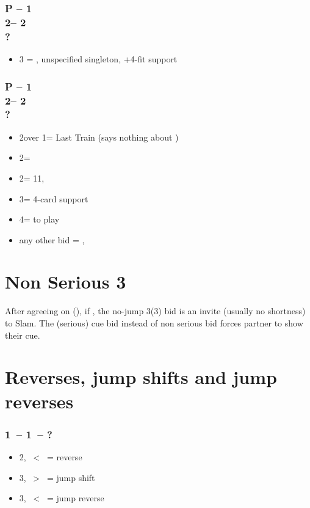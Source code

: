 \subsubsection*{P -- 1\major \\ 2\clubs -- 2\major \\ ?}
\begin{itemize}
    \item 3 = \nat, unspecified singleton, +4-fit \major support
\end{itemize}

\subsubsection*{P -- 1\major \\ 2\clubs -- 2\diams \\ ?}
\begin{itemize}
    \item 2\hearts over 1\spades = Last Train (says nothing about \hearts)
    \item 2\major = \soff
    \item 2\nt = 11, \bal
    \item 3\major = 4-card support
    \item 4\major = to play
    \item any other bid = \nat, \inv
\end{itemize}

\section{\texorpdfstring{Non Serious 3\ntx}{nonSerious3nt}}\label{sec:nonSerious3nt}

After agreeing on \hearts (\spades), if \gf, the no-jump 3\spades (3\nt) bid is
an invite (usually no shortness) to Slam. The (serious) cue bid instead of non serious bid
forces partner to show their cue.

\section{\texorpdfstring{Reverses, jump shifts and jump reverses}{reverses}}\label{sec:reverses}

\subsubsection*{1\ -- 1\ -- ?}
\begin{itemize}
    \item 2, \ < \ = reverse
    \item 3, \ > \ = jump shift
    \item 3, \ < \ = jump reverse
\end{itemize}

